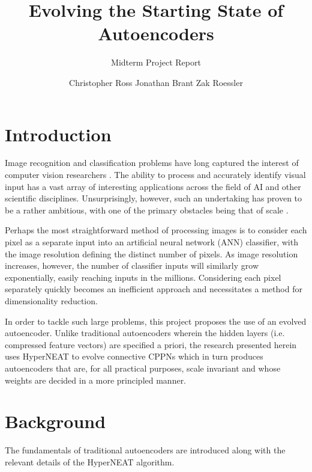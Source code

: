 \documentclass{acm_proc_article-sp}
\begin{document}
\title{Evolving the Starting State of Autoencoders}
\subtitle{Midterm Project Report}

\author{
\alignauthor Christopher Ross	
\alignauthor Jonathan Brant
\alignauthor Zak Roessler
}

\maketitle

\section{Introduction}
Image recognition and classification problems have long captured the interest of computer vision researchers \cite{shapiro2001computer, morris2004computer, sonka2008image}.  The ability to process and accurately identify visual input has a vast array of interesting applications across the field of AI and other scientific disciplines.  Unsurprisingly, however, such an undertaking has proven to be a rather ambitious, with one of the primary obstacles being that of scale \cite{DBLP:journals/corr/RussakovskyDSKSMHKKBBF14}.

Perhaps the most straightforward method of processing images is to consider each pixel as a separate input into an artificial neural network (ANN) classifier, with the image resolution defining the distinct number of pixels.  As image resolution increases, however, the number of classifier inputs will similarly grow exponentially, easily reaching inputs in the millions.  Considering each pixel separately quickly becomes an inefficient approach and necessitates a method for dimensionality reduction.

In order to tackle such large problems, this project proposes the use of an evolved autoencoder. Unlike traditional autoencoders wherein the hidden layers (i.e. compressed feature vectors) are specified a priori, the research presented herein uses HyperNEAT to evolve connective CPPNs which in turn produces autoencoders that are, for all practical purposes, scale invariant and whose weights are decided in a more principled manner.


\section{Background}
The fundamentals of traditional autoencoders are introduced along with the relevant details of the HyperNEAT algorithm.
\end{document}
